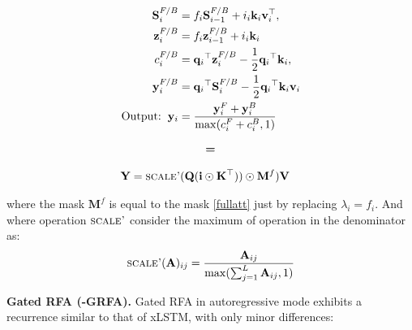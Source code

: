 \begin{minipage}[t]{0.46\textwidth}
\begin{whitebox}
    \begin{align}
        \mathbf{S}^{F/B}_i &= f_i\mathbf{S}^{F/B}_{i-1} + i_i\mathbf{k}_i \mathbf{v}_i^{\top}, \\
    \mathbf{z}^{F/B}_i & =  f_i\mathbf{z}^{F/B}_{i-1} +  i_i\mathbf{k}_i \\
    c^{F/B}_i & =  {{{\mathbf{q}_i}}^{\top} \mathbf{z}^{F/B}_{i}} - \frac{1}{2}{{\mathbf{q}_i}}^{\top} \mathbf{k}_i, \\
    \mathbf{y}^{F/B}_i &= {{{\mathbf{q}_i}}^{\top} \mathbf{S}^{F/B}_i}  - \frac{1}{2}{{\mathbf{q}_i}}^{\top} \mathbf{k}_i \mathbf{v}_i \\
    \text{Output:} \hspace{2mm} \mathbf{y}_i & = \frac{\mathbf{y}^F_i+\mathbf{y}^B_i}{\max(c^F_i+c^B_i,1)}
    \end{align}
\end{whitebox}
\end{minipage}
\begin{minipage}[t]{0.05\textwidth}
\vspace{-2.4cm}
    \begin{align}
       \textbf{=} \notag
    \end{align}
\end{minipage}
\begin{minipage}[t]{0.48\textwidth}
\vspace{-2.42cm}
\begin{whitebox}
    \begin{align}
        \mathbf{Y} &= \textsc{scale'}(\mathbf{Q}(\mathbf{i}\odot\mathbf{K}^{\top}))\odot \mathbf{M}^f)\mathbf{V}
    \label{xlstmvec1}
    \end{align}
\end{whitebox}
\end{minipage}

where the mask $\mathbf{M}^f$ is equal to the \lion mask \eqref{fullatt} just by replacing $\lambda_i = f_i$. And where operation $\textsc{scale'}$ consider the maximum of operation in the denominator as:
\begin{equation}
    \textsc{scale'}(\mathbf{A})_{ij} = \frac{\mathbf{A}_{ij}}{\max(\sum_{j=1}^L \mathbf{A}_{ij},1)}
\end{equation}


\textbf{Gated RFA (\lion-\textsc{GRFA}).} Gated RFA \citep{yang2023gated} in autoregressive mode exhibits a recurrence similar to that of xLSTM, with only minor differences:

